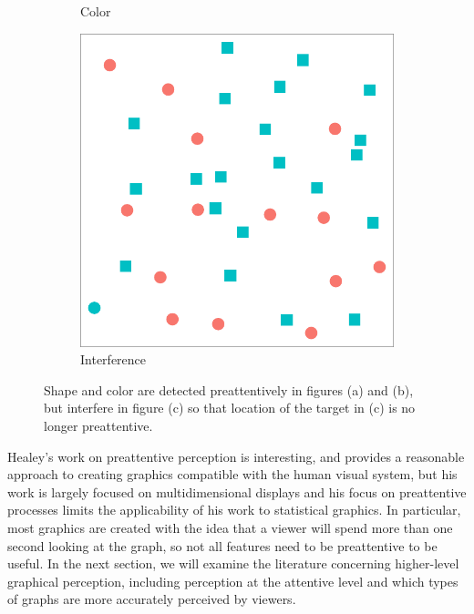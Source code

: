 \documentclass[11pt]{isuthesis}\usepackage[]{graphicx}\usepackage[]{color}
\begin{document}
\begin{figure}[htbp]
\begin{subfigure}[b]{.3\textwidth}
  \caption{Color}\label{fig:preattentivecolor}
\end{subfigure}\hfill
\begin{subfigure}[b]{.3\textwidth}\centering
  \includegraphics[width=\textwidth]{fig-preattentive22}
  \caption{Interference}\label{fig:preattentiveinterference}
\end{subfigure}
\caption[Preattentive Features and Interference]{Shape and color are detected preattentively in figures (a) and (b), but interfere in figure (c) so that location of the target in (c) is no longer preattentive.}\label{fig:preattentive}
\end{figure}

Healey's work on preattentive perception is interesting, and provides a reasonable approach to creating graphics compatible with the human visual system, but his work is largely focused on multidimensional displays and his focus on preattentive processes limits the applicability of his work to statistical graphics. In particular, most graphics are created with the idea that a viewer will spend more than one second looking at the graph, so not all features need to be preattentive to be useful. In the next section, we will examine the literature concerning higher-level graphical perception, including perception at the attentive level and which types of graphs are more accurately perceived by viewers. 
\end{document}
